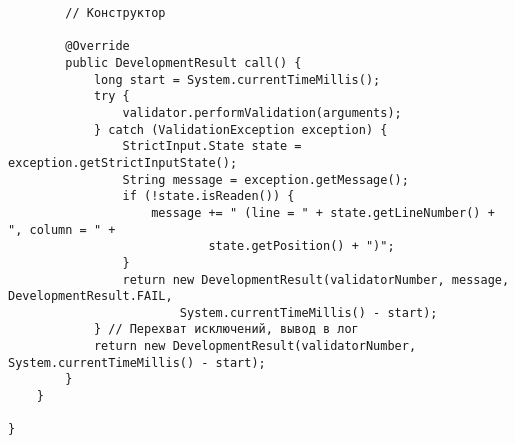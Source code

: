 \begin{verbatim}
        // Конструктор
        
        @Override
        public DevelopmentResult call() {
            long start = System.currentTimeMillis();
            try {
                validator.performValidation(arguments);
            } catch (ValidationException exception) {
                StrictInput.State state = exception.getStrictInputState();
                String message = exception.getMessage();
                if (!state.isReaden()) {
                    message += " (line = " + state.getLineNumber() + ", column = " +
                            state.getPosition() + ")";
                }
                return new DevelopmentResult(validatorNumber, message, DevelopmentResult.FAIL,
                        System.currentTimeMillis() - start);
            } // Перехват исключений, вывод в лог
            return new DevelopmentResult(validatorNumber, System.currentTimeMillis() - start);
        }
    }
    
}
\end{verbatim}

